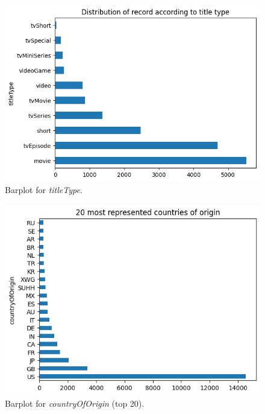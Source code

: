 \begin{figure}
    \includegraphics[width=\columnwidth]{../results/images/barplot_titleType.png}
    \caption{Barplot for \textit{titleType}.}
    \label{fig:barplot_titleType.png}
\end{figure}

\begin{figure}
    \includegraphics[width=\columnwidth]{../results/images/barplot_countryOfOrigin.png}
    \caption{Barplot for \textit{countryOfOrigin} (top 20).}
    \label{fig:barplot_countryOfOrigin.png}
\end{figure}

